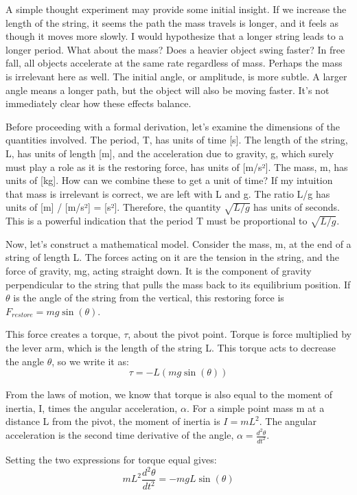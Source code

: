 \documentclass[12pt]{article}
\begin{document}
A simple thought experiment may provide some initial insight. If we increase the length of the string, it seems the path the mass travels is longer, and it feels as though it moves more slowly. I would hypothesize that a longer string leads to a longer period. What about the mass? Does a heavier object swing faster? In free fall, all objects accelerate at the same rate regardless of mass. Perhaps the mass is irrelevant here as well. The initial angle, or amplitude, is more subtle. A larger angle means a longer path, but the object will also be moving faster. It's not immediately clear how these effects balance.

Before proceeding with a formal derivation, let's examine the dimensions of the quantities involved. The period, T, has units of time [s]. The length of the string, L, has units of length [m], and the acceleration due to gravity, g, which surely must play a role as it is the restoring force, has units of [m/s²]. The mass, m, has units of [kg]. How can we combine these to get a unit of time? If my intuition that mass is irrelevant is correct, we are left with L and g. The ratio L/g has units of [m] / [m/s²] = [s²]. Therefore, the quantity \(\sqrt{L/g}\) has units of seconds. This is a powerful indication that the period T must be proportional to \(\sqrt{L/g}\).

Now, let's construct a mathematical model. Consider the mass, m, at the end of a string of length L. The forces acting on it are the tension in the string, and the force of gravity, mg, acting straight down. It is the component of gravity perpendicular to the string that pulls the mass back to its equilibrium position. If \(\theta\) is the angle of the string from the vertical, this restoring force is \(F_{restore} = mg \sin(\theta)\).

This force creates a torque, \(\tau\), about the pivot point. Torque is force multiplied by the lever arm, which is the length of the string L. This torque acts to decrease the angle \(\theta\), so we write it as:
\[\tau = -L (mg \sin(\theta))\]

From the laws of motion, we know that torque is also equal to the moment of inertia, I, times the angular acceleration, \(\alpha\). For a simple point mass m at a distance L from the pivot, the moment of inertia is \(I = mL^2\). The angular acceleration is the second time derivative of the angle, \(\alpha = \frac{d^2\theta}{dt^2}\).

Setting the two expressions for torque equal gives:
\[mL^2 \frac{d^2\theta}{dt^2} = -mgL \sin(\theta)\]
\end{document}

